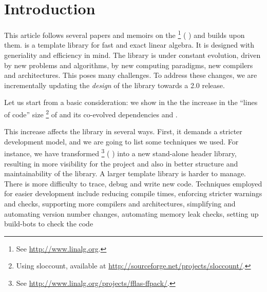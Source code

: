 \section{Introduction}
%
This article follows several papers and memoirs on the \linbox%
%
\footnote{See \url{http://www.linalg.org}.}
%
(\cf{} \cite{Giorgi:2004:these,Turner:2002:these,Boyer:2012:these,Dumas:2002:icms,Dumas:2010:lbpar})
and builds upon them.
%
\linbox is a \cpp template library for fast and exact linear algebra. It is designed with generiality
and efficiency in mind.
%
%
The \linbox library is under constant evolution, driven by new problems and
algorithms, by new computing paradigms, new compilers and architectures. This
poses many challenges. To address these changes, we are incrementally
updating the \emph{design} of the library towards a \textsf{2.0} release.
%
\par
%
Let us start from a basic consideration: we show in the  the
increase in the ``lines of code'' size
%
\footnote{Using \textsf{sloccount}, available at
\url{http://sourceforge.net/projects/sloccount/}.}
%
of \linbox and its co-evolved dependencies \givaro and \fflasffpack.
%
%

%
This increase affects the library in several ways.  First, it demands a
stricter development model, and we are going to list some techniques we used.
For instance, we have transformed \fflasffpack %
%
\footnote{See \url{http://www.linalg.org/projects/fflas-ffpack/}.}
(\cf{} \cite{Dumas:2008:Flas}) into a new stand-alone header library, resulting
in more visibility for the \fflasffpack project
and also in better structure and maintainability of the library.
%
%
A larger template library is harder to manage. There is more difficulty
to trace, debug and write new code. Techniques employed
for easier development include reducing
compile times, enforcing stricter warnings and checks, supporting more
compilers and architectures, simplifying and automating version number
changes, automating memory leak checks, setting up build-bots to check the code
